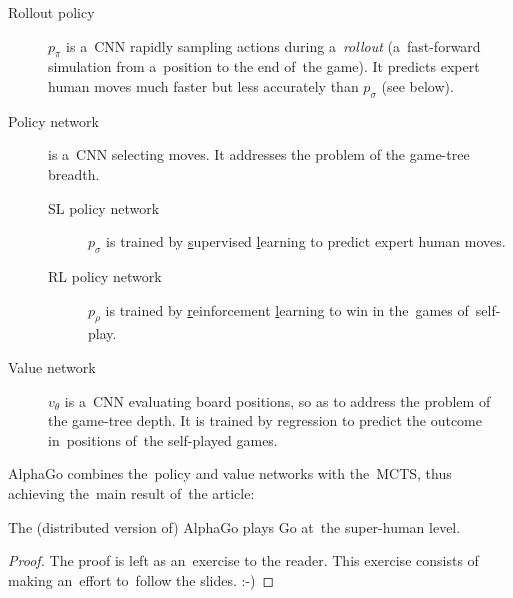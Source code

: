 \documentclass[a4paper,10pt]{article}
\begin{document}
\begin{description}
  \item [Rollout policy] $p_\pi$ is a~CNN rapidly sampling actions during a~\emph{rollout} (a~fast-forward simulation from a~position to the end of~the game).
    It predicts expert human moves much faster but less accurately than $p_\sigma$ (see below).

  \item [Policy network] is a~CNN selecting moves.
    It addresses the problem of the game-tree breadth.
    \begin{description}
      \item [SL policy network] $p_\sigma$ is trained by \underline{s}upervised \underline{l}earning to predict expert human moves.
        \item [RL policy network] $p_\rho$ is trained by \underline{r}einforcement \underline{l}earning to win in the~games of~self-play.
    \end{description}

  \item [Value network] $v_\theta$ is a~CNN evaluating board positions, so as to address the problem of the game-tree depth.
    It is trained by regression to predict the outcome in~positions of~the self-played games.
\end{description}

AlphaGo combines the~policy and value networks with the~MCTS, thus achieving the~main result of~the article:
\begin{theorem}
  The (distributed version of) AlphaGo plays Go at~the super-human level.
\end{theorem}

\begin{proof}
  The proof is left as an~exercise to the reader.
  This exercise consists of making an~effort to~follow the slides.
  :-)
\end{proof}
\end{document}
